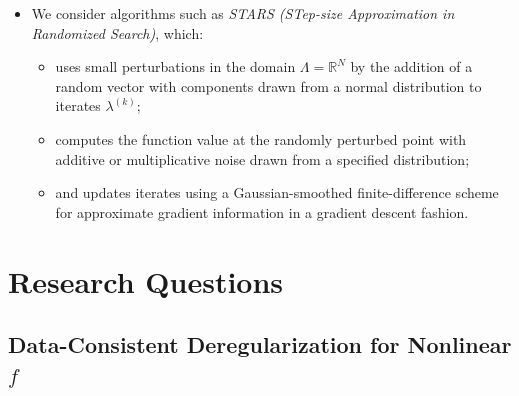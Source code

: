\documentclass[11pt]{beamer}
\newcommand{\R}{\mathbb{R}}
\begin{document}
\begin{frame}

\begin{itemize}

	\item We consider algorithms such as \textit{STARS \footnotemark[1] (STep-size Approximation in Randomized Search)}, which: 

\begin{itemize}
		\item uses small perturbations in the domain $\Lambda=\R^N$ by the addition of a random vector with components drawn from a normal distribution to iterates $\lambda^{(k)}$; 
		\item computes the function value at the randomly perturbed point with additive or multiplicative noise drawn from a specified distribution; 
		\item and updates iterates using a Gaussian-smoothed finite-difference scheme for approximate gradient information in a gradient descent fashion. 

\end{itemize}

\end{itemize}


\end{frame}




\section{Research Questions}


\subsection{Data-Consistent Deregularization for Nonlinear $f$}
\end{document}
